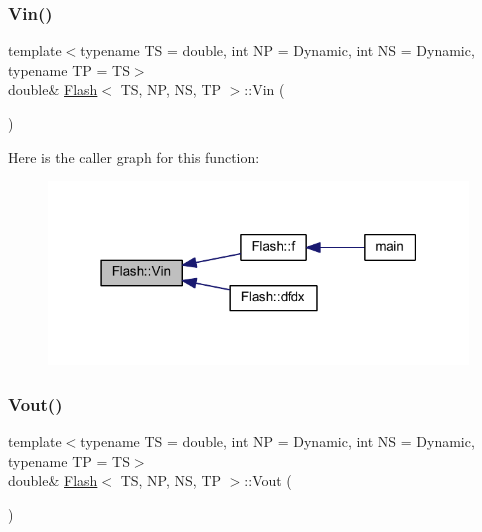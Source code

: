 \subsubsection{\texorpdfstring{Vin()}{Vin()}}
{\footnotesize\ttfamily template$<$typename TS = double, int NP = Dynamic, int NS = Dynamic, typename TP = TS$>$ \\
double\& \mbox{\hyperlink{class_flash}{Flash}}$<$ TS, NP, NS, TP $>$\+::Vin (\begin{DoxyParamCaption}{ }\end{DoxyParamCaption})\hspace{0.3cm}{\ttfamily [inline]}}

Here is the caller graph for this function\+:
\nopagebreak
\begin{figure}[H]
\begin{center}
\leavevmode
\includegraphics[width=316pt]{class_flash_aa4358ff3c66c1c461a2dba41436b95fe_icgraph}
\end{center}
\end{figure}
\mbox{\label{class_flash_a14aa681b115b9ca955ab775ff5e674e0}} 
\subsubsection{\texorpdfstring{Vout()}{Vout()}}
{\footnotesize\ttfamily template$<$typename TS = double, int NP = Dynamic, int NS = Dynamic, typename TP = TS$>$ \\
double\& \mbox{\hyperlink{class_flash}{Flash}}$<$ TS, NP, NS, TP $>$\+::Vout (\begin{DoxyParamCaption}{ }\end{DoxyParamCaption})\hspace{0.3cm}{\ttfamily [inline]}}

